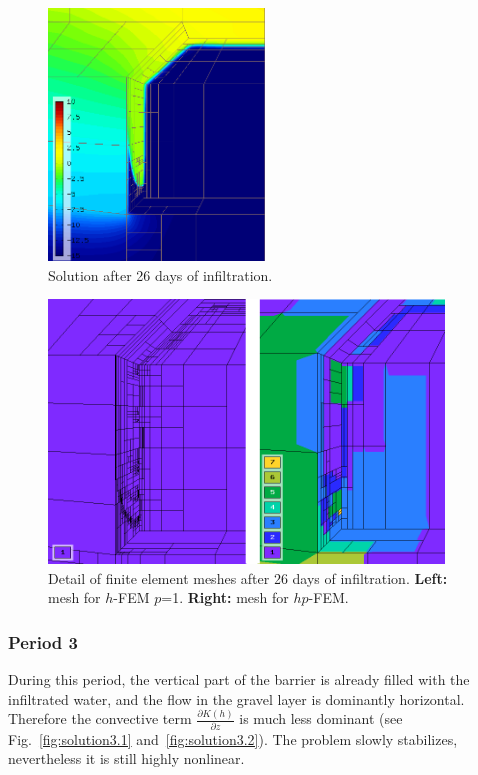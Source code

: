 \documentclass[final,3p,times,twocolumn]{elsarticle}
\begin{document}
\begin{figure}[!htb]
\begin{center}
\includegraphics[height=6.7cm]{solution2-2.png}
\end{center}
\vspace{-4mm}
\caption{Solution after 26 days of infiltration. }
\label{fig:solution2.2}
\end{figure}

\begin{figure}[!htb]
\begin{center}
\includegraphics[height=7cm]{solution3-mesh2.png}
\end{center}
\vspace{-4mm}
\caption{Detail of finite element meshes after 26 days of infiltration. \textbf{Left:} mesh for $h$-FEM $p$=1. \textbf{Right:} mesh for $hp$-FEM.}
\label{fig:solution2-mesh}
\end{figure}


\subsubsection{Period 3}
During this period, the vertical part of the barrier is already filled with the infiltrated water, 
and the flow in the gravel layer is dominantly horizontal. Therefore the convective term 
$\frac{\partial K(h)}{\partial z}$ is much less dominant (see Fig.~\ref{fig:solution3.1} 
and~\ref{fig:solution3.2}). The problem slowly stabilizes, nevertheless it is still highly nonlinear.
\end{document}
